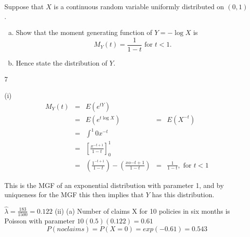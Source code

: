 \documentclass[a4paper,12pt]{article}
\begin{document}
 


Suppose that $X$ is a continuous random variable uniformly distributed on $(0, 1)$.
\begin{enumerate}[(a)]
    \item  Show that the moment generating function of $Y = - \log X$ is
\[M_Y(t) = \frac{1}{1 - t} \mbox{ for } t < 1.\] 
    \item Hence state the distribution of $Y$. 
\end{enumerate}

7 

(i)
\begin{eqnarray*}
M_Y( t ) &=& E ( e^{tY} ) \\ 
&=& E ( e^{t\log X} )
&=& E(X^{-t}) \\
&=& \int^{1}{0} x^{-t}\\
&=& \left[ \frac{x^{-t+1}}{1-t}\right]^{1}_{0} \\
&=& \left(  \frac{1^{-t+1}}{1-t}\right) - \left( \frac{xo{-t+1}}{1-t}\right)
&=& \frac{1}{1-t}, \mbox{ for } t < 1
\end{eqnarray*}

This is the MGF of an exponential distribution with parameter 1, and by
uniqueness for the MGF this then implies that $Y$ has this distribution.




$ \hat{\lambda} = \frac{183}{1500} = 0.122$
(ii) (a)
Number of claims X for 10 policies in six months is Poisson with
parameter $10(0.5)(0.122) = 0.61$
\[P(no claims) = P(X = 0) = exp(-0.61) = 0.543\]
\end{document}
